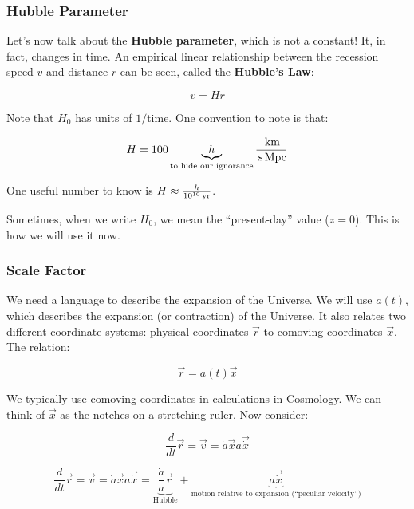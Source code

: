 \documentclass{article}
\newcommand{\unit}[1]{{\,\rm #1}}
\newcommand{\Mpc}{\unit{Mpc}}
\newcommand{\s}{\unit{s}}
\newcommand{\km}{\unit{km}}
\newcommand{\yr}{\unit{yr}}
\begin{document}
\subsubsection{Hubble Parameter}

Let's now talk about the \textbf{Hubble parameter}, which is not a constant! It, in fact, changes in time. An empirical linear relationship between the recession speed $v$ and distance $r$ can be seen, called the \textbf{Hubble's Law}:

\begin{equation}
v = H r
\end{equation}

Note that $H_0$ has units of $1/$time. One convention to note is that:

\begin{equation}
H = 100 \underbrace{h}_\text{to hide our ignorance} \frac{\km}{\s \Mpc}
\end{equation}

One useful number to know is $H \approx \frac{h}{10^{10} \yr}$.

Sometimes, when we write $H_0$, we mean the ``present-day'' value ($z = 0$). This is how we will use it now.

\subsubsection{Scale Factor}

We need a language to describe the expansion of the Universe. We will use $a(t)$, which describes the expansion (or contraction) of the Universe. It also relates two different coordinate systems: physical coordinates $\vec{r}$ to comoving coordinates $\vec{x}$. The relation:

\begin{equation}
    \vec{r} = a(t) \vec{x}
\end{equation}

We typically use comoving coordinates in calculations in Cosmology. We can think of $\vec{x}$ as the notches on a stretching ruler. Now consider:

\begin{equation}
    \frac{d}{dt}\vec{r} = \vec{v} = \dot{a} \vec{x} a \vec{\dot{x}}
\end{equation}

\begin{equation}
    \frac{d}{dt}\vec{r} = \vec{v} = \dot{a} \vec{x} a \vec{\dot{x}} = \underbrace{\frac{\dot{a}}{a} \vec{r}}_\text{Hubble} + \underbrace{a \vec{\dot{x}}}_\text{motion relative to expansion (``peculiar velocity'')}
\end{equation}
\end{document}
